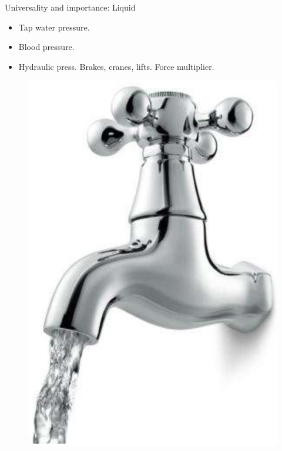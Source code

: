 \documentclass[usenames,dvipsnames]{beamer}
\begin{document}
\begin{frame}{\huge{Universality and importance: Liquid}}%
   \begin{itemize}
       \item Tap water pressure.
       \item Blood pressure.
       \item Hydraulic press. Brakes, cranes, lifts. Force multiplier.
   \end{itemize}
      \begin{figure}
          \centering
          \includegraphics[scale=0.2]{Images/tap.png}

\end{figure}
\end{frame}
\end{document}
